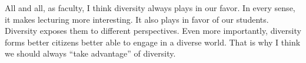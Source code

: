 \documentclass[10pt,stdletter,dateno,sigleft]{newlfm} %
\begin{document}
\begin{newlfm}
All and all, as faculty, I think diversity always plays in our favor. In every sense, it makes lecturing more interesting. It also plays in favor of our  students. Diversity exposes them to different perspectives. Even more importantly, diversity forms better citizens better able to engage in a diverse world. That is why I think we should always ``take advantage'' of diversity.

{\unskip}

\vspace{-10cm}

\end{newlfm}
\end{document}

